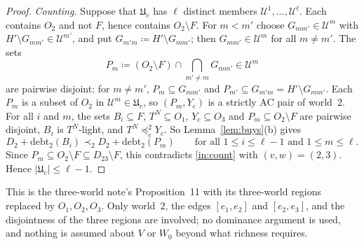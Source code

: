 \documentclass[11pt]{article}
\theoremstyle{definition}\newtheorem{definition}[theorem]{Definition}
\theoremstyle{remark}\newtheorem{remark}[theorem]{Remark}
\newcommand{\debt}{\mathrm{debt}}
\newcommand{\Uf}{\mathcal U}
\newcommand{\UU}{\mathfrak U}
\begin{document}
\begin{proof}
\emph{Counting.} Suppose that $\UU_c$ has $\ell$ distinct members
$\Uf^1,\dots,\Uf^\ell$. Each contains $O_2$ and not $F$, hence contains
$O_2\setminus F$. For $m<m'$ choose $G_{mm'}\in\Uf^m$ with
$H'\setminus G_{mm'}\in\Uf^{m'}$, and put $G_{m'm}\coloneqq H'\setminus
G_{mm'}$; then $G_{mm'}\in\Uf^m$ for all $m\ne m'$. The sets
\[
 P_m\coloneqq(O_2\setminus F)\cap\bigcap_{m'\ne m}G_{mm'}\in\Uf^m
\]
are pairwise disjoint: for $m\ne m'$, $P_m\subseteq G_{mm'}$ and
$P_{m'}\subseteq G_{m'm}=H'\setminus G_{mm'}$. Each $P_m$ is a subset of
$O_2$ in $\Uf^m\in\UU_c$, so $(P_m,Y_c)$ is a strictly AC pair of
world~$2$. For all $i$ and $m$, the sets $B_i\subseteq F$,
$T^N\subseteq O_1$, $Y_c\subseteq O_3$ and $P_m\subseteq O_2\setminus F$
are pairwise disjoint, $B_i$ is $T^N$-light, and $T^N\preceq^2_cY_c$. So
Lemma~\ref{lem:buys}(b) gives
\[
 D_2+\debt_2(B_i)\prec_2D_2+\debt_2(P_m)\qquad
 \text{for all }1\le i\le\ell-1\text{ and }1\le m\le\ell.
\]
Since $P_m\subseteq O_2\setminus F\subseteq D_{23}\setminus F$, this
contradicts \ref{in:count} with $(v,w)=(2,3)$. Hence $|\UU_c|\le\ell-1$.
\end{proof}

This is the three-world note's Proposition~11 with its three-world regions
replaced by $O_1,O_2,O_3$. Only world~$2$, the edges $[e_1,e_2]$ and $[e_2,e_3]$, and
the disjointness of the three regions are involved; no dominance argument
is used, and nothing is assumed about $V$ or $W_0$ beyond what richness
requires.
\end{document}
